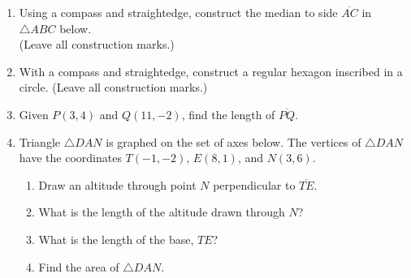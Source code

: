 \documentclass[12pt, twoside]{article}
\begin{document}
\begin{enumerate}
\newpage

    \item Using  a  compass  and  straightedge,  construct  the  median  to  side $\overline{AC}$ in $\triangle ABC$ below.\\ (Leave all construction marks.)
      \vspace{1cm}
    \begin{center}
    \end{center}

      \vspace{2cm}

    \item With a compass and straightedge, construct a regular hexagon inscribed in a circle. (Leave all construction marks.)

\newpage
  \item Given $P(3,4)$ and $Q(11,-2)$, find the length of $\overline{PQ}$.
      \vspace{4cm}

  \item Triangle $\triangle DAN$ is graphed on the set of axes below. The vertices of $\triangle DAN$ have the coordinates $T(-1,-2)$, $E(8,1)$, and $N(3,6)$.
    \begin{center} %
    \end{center}
    \begin{enumerate}
      \item Draw an altitude through point $N$ perpendicular to $\overline{TE}$.
      \item What is the length of the altitude drawn through $N$? \vspace{1.5cm}
      \item What is the length of the base, $TE$?  \vspace{1.5cm}
      \item Find the area of  $\triangle DAN$.
    \end{enumerate}


\end{enumerate}
\end{document}
